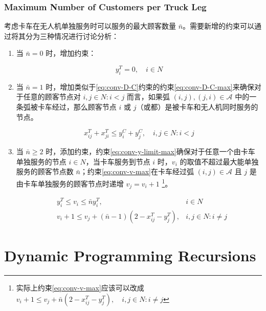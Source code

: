 \documentclass[fontset=none]{ctexart}
\begin{document}
\subsubsection{Maximum Number of Customers per Truck Leg}
考虑卡车在无人机单独服务时可以服务的最大顾客数量 $\bar{n}$。需要新增的约束可以通过将其分为三种情况进行讨论分析：

\begin{enumerate}
    \item 当 $\bar{n} = 0$ 时，增加约束：
    \begin{corollary}
        \begin{equation*}
            y_i^T = 0, \quad i \in N
        \end{equation*}
    \end{corollary}
    \item 当 $\bar{n} = 1$ 时，增加类似于\cref{eq:conv-D-C}约束的约束\cref{eq:conv-D-C-max}来确保对于任意的顾客节点对 $i, j \in N: i < j$ 而言，如果弧 $(i, j), (j, i) \in \mathcal{A}$ 中的一条弧被卡车经过，那么顾客节点 $i$ 或 $j$（或都）是被卡车和无人机同时服务的节点。
    \begin{corollary}
        \begin{equation}
            x_{ij}^T + x_{ji}^T \leq y_i^C + y_j^C, \quad i,j \in N: i <j \tag{10}\label{eq:conv-D-C-max}
        \end{equation}
    \end{corollary}
    \item 当 $\bar{n} \geq 2$ 时，添加约束，约束\cref{eq:conv-y-limit-max}确保对于任意一个由卡车单独服务的节点 $i \in N$，当卡车服务到节点 $i$ 时，$v_i$ 的取值不超过最大能单独服务的顾客节点数 $\bar{n}$；约束\cref{eq:conv-v-max}在卡车经过弧 $(i ,j) \in \mathcal{A}$ 且 $j$ 是由卡车单独服务的顾客节点时递增 $v_j = v_i + 1$ \footnote{实际上约束\cref{eq:conv-v-max}应该可以改成 $v_i + 1 \leq v_j + \bar{n}\left(2 - x_{ij}^T - y_j^T\right), \quad i, j \in N: i \neq j$}。
    \begin{corollary}
        \begin{align}
            & y_i^T \leq v_i \leq \bar{n}y_i^T, & i \in N \tag{11a} \label{eq:conv-y-limit-max} \\
            & v_i + 1 \leq v_j + (\bar{n} - 1)\left(2 - x_{ij}^T - y_j^T\right), & i,j \in N: i \neq j \tag{11b}\label{eq:conv-v-max}
        \end{align}
    \end{corollary}
\end{enumerate}

\section{Dynamic Programming Recursions}


\end{document}

